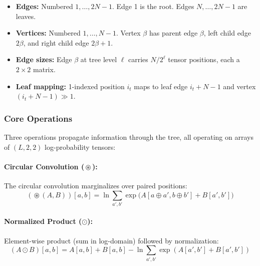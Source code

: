 \documentclass[11pt,a4paper]{article}
\DeclareMathOperator{\circconv}{\circledast}
\begin{document}
\begin{itemize}
  \item \textbf{Edges:} Numbered $1, \ldots, 2N{-}1$. Edge 1 is the root. Edges $N, \ldots, 2N{-}1$ are leaves.
  \item \textbf{Vertices:} Numbered $1, \ldots, N{-}1$. Vertex $\beta$ has parent edge $\beta$, left child edge $2\beta$, and right child edge $2\beta + 1$.
  \item \textbf{Edge sizes:} Edge $\beta$ at tree level $\ell$ carries $N / 2^\ell$ tensor positions, each a $2 \times 2$ matrix.
  \item \textbf{Leaf mapping:} 1-indexed position $i_t$ maps to leaf edge $i_t + N - 1$ and vertex $(i_t + N - 1) \gg 1$.
\end{itemize}

\subsubsection{Core Operations}

Three operations propagate information through the tree, all operating on
arrays of $(L, 2, 2)$ log-probability tensors:

\paragraph{Circular Convolution ($\circconv$):}
The circular convolution marginalizes over paired positions:
\begin{equation}
  (\circconv(A, B))[a, b] = \ln \sum_{a', b'} \exp\bigl(A[a \oplus a', b \oplus b'] + B[a', b']\bigr)
\end{equation}

\paragraph{Normalized Product ($\odot$):}
Element-wise product (sum in log-domain) followed by normalization:
\begin{equation}
  (A \odot B)[a, b] = A[a,b] + B[a,b] - \ln \sum_{a',b'} \exp(A[a',b'] + B[a',b'])
\end{equation}
\end{document}
